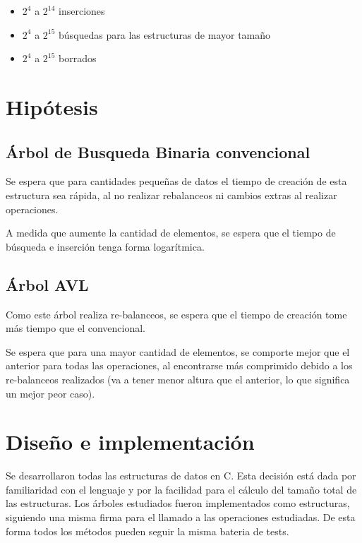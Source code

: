 \documentclass[12pt,letterpaper,hidelinks]{extarticle}
\begin{document}
	\begin{itemize}
			\item $2^{4}$ a $2^{14}$ inserciones
			\item $2^{4}$ a $2^{15}$ búsquedas para las estructuras de mayor tamaño
			\item $2^{4}$ a $2^{15}$ borrados
	\end{itemize}

\newpage
\section{Hipótesis}

	\subsection{Árbol de Busqueda Binaria convencional}
		Se espera que para cantidades pequeñas de datos el tiempo de creación de esta estructura
		sea rápida, al no realizar rebalanceos ni cambios extras al realizar operaciones.

		A medida que aumente la cantidad de elementos, se espera que el tiempo de búsqueda e inserción
		tenga forma logarítmica.

	\subsection{Árbol AVL}
		Como este árbol realiza re-balanceos, se espera que el tiempo de creación tome más tiempo que el
		convencional.

		Se espera que para una mayor cantidad de elementos, se comporte mejor que el anterior para todas las operaciones, al encontrarse más comprimido
		 debido a los re-balanceos realizados (va a tener menor altura que el anterior, lo que significa un mejor peor caso).



\newpage
\section{Diseño e implementación}


Se desarrollaron todas las estructuras de datos en C. Esta decisión está dada por familiaridad con el lenguaje y por la facilidad para el cálculo del tamaño total de las estructuras.
Los árboles estudiados fueron implementados como estructuras, siguiendo una misma firma para el llamado a las operaciones estudiadas. De esta forma todos los métodos pueden seguir la misma bateria de tests.
\end{document}
